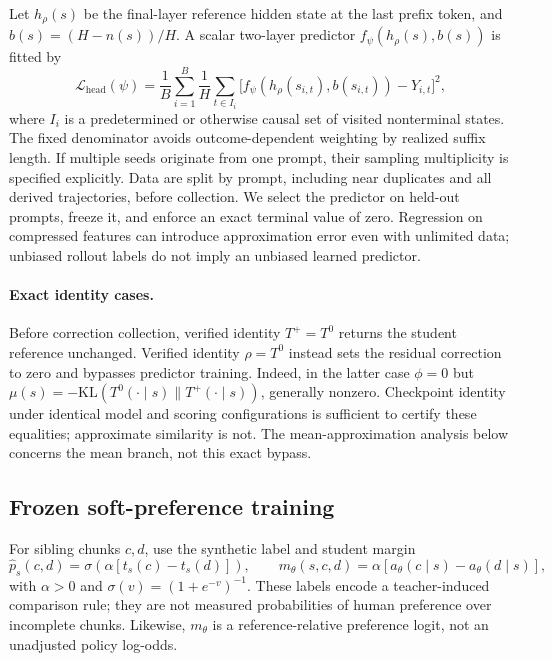 \documentclass[pdflatex,sn-mathphys-num,review]{sn-jnl}
\theoremstyle{thmstyleone}
\theoremstyle{thmstyletwo}
\theoremstyle{thmstylethree}
\providecommand{\Tp}{T^{+}}
\providecommand{\Tz}{T^{0}}
\providecommand{\KL}{\mathrm{KL}}
\providecommand{\phat}{\widehat{p}}
\begin{document}
Let $h_\rho(s)$ be the final-layer reference hidden state at the last prefix token, and $b(s)=(H-n(s))/H$. A scalar two-layer predictor $f_\psi(h_\rho(s),b(s))$ is fitted by
\begin{equation}
\mathcal L_{\mathrm{head}}(\psi)=\frac1B\sum_{i=1}^B\frac1H
\sum_{t\in I_i}\big[f_\psi(h_\rho(s_{i,t}),b(s_{i,t}))-Y_{i,t}\big]^2,
\label{eq:head}
\end{equation}
where $I_i$ is a predetermined or otherwise causal set of visited nonterminal states. The fixed denominator avoids outcome-dependent weighting by realized suffix length. If multiple seeds originate from one prompt, their sampling multiplicity is specified explicitly. Data are split by prompt, including near duplicates and all derived trajectories, before collection. We select the predictor on held-out prompts, freeze it, and enforce an exact terminal value of zero. Regression on compressed features can introduce approximation error even with unlimited data; unbiased rollout labels do not imply an unbiased learned predictor.

\paragraph{Exact identity cases.}
Before correction collection, verified identity $\Tp=\Tz$ returns the student reference unchanged. Verified identity $\rho=\Tz$ instead sets the residual correction to zero and bypasses predictor training. Indeed, in the latter case $\phi=0$ but $\mu(s)=-\KL(\Tz(\cdot\mid s)\|\Tp(\cdot\mid s))$, generally nonzero. Checkpoint identity under identical model and scoring configurations is sufficient to certify these equalities; approximate similarity is not. The mean-approximation analysis below concerns the mean branch, not this exact bypass.

\subsection{Frozen soft-preference training}
\label{subsec:loss}
For sibling chunks $c,d$, use the synthetic label and student margin
\begin{equation}
\phat_s(c,d)=\sigma\!\left(\alpha[t_s(c)-t_s(d)]\right),\qquad
m_\theta(s,c,d)=\alpha[a_\theta(c\mid s)-a_\theta(d\mid s)],
\label{eq:pair}
\end{equation}
with $\alpha>0$ and $\sigma(v)=(1+e^{-v})^{-1}$. These labels encode a teacher-induced comparison rule; they are not measured probabilities of human preference over incomplete chunks. Likewise, $m_\theta$ is a reference-relative preference logit, not an unadjusted policy log-odds.
\end{document}
